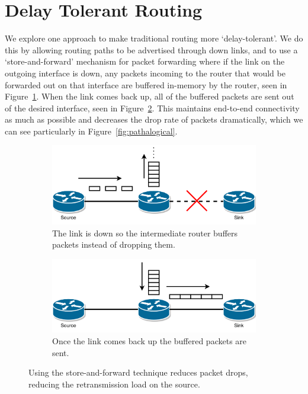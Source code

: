 \documentclass[withindex,glossary,openany]{cam-thesis}
\begin{document}
\section{Delay Tolerant Routing}
We explore one approach to make traditional routing more `delay-tolerant'. We do this by allowing routing paths to be advertised through down links, and to use a `store-and-forward' mechanism for packet forwarding where if the link on the outgoing interface is down, any packets incoming to the router that would be forwarded out on that interface are buffered in-memory by the router, seen in Figure~\ref{fig:saf_down}. When the link comes back up, all of the buffered packets are sent out of the desired interface, seen in Figure~\ref{fig:saf_up}. This maintains end-to-end connectivity as much as possible and decreases the drop rate of packets dramatically, which we can see particularly in Figure~\ref{fig:pathalogical}.

\begin{center}
\begin{minipage}{0.9\textwidth} \centering
\begin{figure}[H]
\centering
\begin{subfigure}{.65\textwidth}
  \centering
  \includegraphics[width=1\linewidth]{storeandforward_down}
  \caption{The link is down so the intermediate router buffers packets instead of dropping them.}
  \label{fig:saf_down}
\end{subfigure}
\begin{subfigure}{.65\textwidth}
  \centering
  \includegraphics[width=1\linewidth]{storeandforward_up}
  \caption{Once the link comes back up the buffered packets are sent.}
  \label{fig:saf_up}
\end{subfigure}
\caption{Using the store-and-forward technique reduces packet drops, reducing the retransmission load on the source.}
\label{fig:saf}
\end{figure}
\end{minipage}
\end{center}
\end{document}
